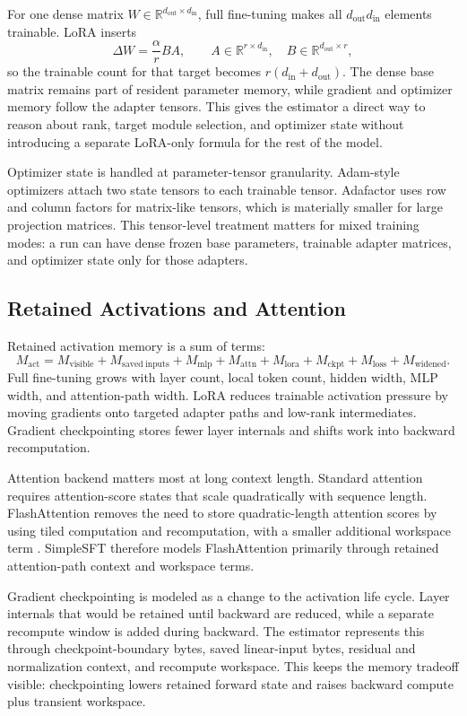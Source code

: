 For one dense matrix $W \in \mathbb{R}^{d_{\mathrm{out}}\times d_{\mathrm{in}}}$,
full fine-tuning makes all $d_{\mathrm{out}}d_{\mathrm{in}}$ elements trainable.
LoRA inserts
\[
\Delta W = \frac{\alpha}{r}BA,\qquad
A \in \mathbb{R}^{r\times d_{\mathrm{in}}},\quad
B \in \mathbb{R}^{d_{\mathrm{out}}\times r},
\]
so the trainable count for that target becomes
$r(d_{\mathrm{in}} + d_{\mathrm{out}})$. The dense base matrix remains part of
resident parameter memory, while gradient and optimizer memory follow the
adapter tensors. This gives the estimator a direct way to reason about rank,
target module selection, and optimizer state without introducing a separate
LoRA-only formula for the rest of the model.

Optimizer state is handled at parameter-tensor granularity. Adam-style
optimizers attach two state tensors to each trainable tensor. Adafactor uses
row and column factors for matrix-like tensors, which is materially smaller for
large projection matrices. This tensor-level treatment matters for mixed
training modes: a run can have dense frozen base parameters, trainable adapter
matrices, and optimizer state only for those adapters.

\subsection{Retained Activations and Attention}
Retained activation memory is a sum of terms:
\[
M_{\mathrm{act}} =
M_{\mathrm{visible}} + M_{\mathrm{saved\ inputs}} + M_{\mathrm{mlp}}
+ M_{\mathrm{attn}} + M_{\mathrm{lora}} + M_{\mathrm{ckpt}}
+ M_{\mathrm{loss}} + M_{\mathrm{widened}}.
\]
Full fine-tuning grows with layer count, local token count, hidden width, MLP
width, and attention-path width. LoRA reduces trainable activation pressure by
moving gradients onto targeted adapter paths and low-rank intermediates.
Gradient checkpointing stores fewer layer internals and shifts work into
backward recomputation.

Attention backend matters most at long context length. Standard attention
requires attention-score states that scale quadratically with sequence length.
FlashAttention removes the need to store quadratic-length attention scores by
using tiled computation and recomputation, with a smaller additional workspace
term \cite{dao2022flashattention}. SimpleSFT therefore models FlashAttention
primarily through retained attention-path context and workspace terms.

Gradient checkpointing is modeled as a change to the activation life cycle.
Layer internals that would be retained until backward are reduced, while a
separate recompute window is added during backward. The estimator represents
this through checkpoint-boundary bytes, saved linear-input bytes, residual and
normalization context, and recompute workspace. This keeps the memory tradeoff
visible: checkpointing lowers retained forward state and raises backward
compute plus transient workspace.

